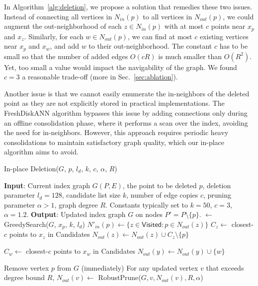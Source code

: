 In Algorithm~\ref{alg:deletion}, we propose a solution that remedies these two issues.
%
Instead of connecting all vertices in $N_{in}(p)$ to all vertices in $N_{out}(p)$, we could augment the out-neighborhood of each $z\in N_{in}(p)$ with at most $c$ points near $x_p$ and $x_z$.
%
Similarly, for each $w\in N_{out}(p)$, we can find at most $c$ existing vertices near $x_p$ and $x_w$,
and add $w$ to their out-neighborhood.
%
The constant $c$ has to be small so that the number of added edges $O(cR)$ is much smaller than $O(R^2)$.
Yet, too small a value would impact the navigability of the graph.
We found $c=3$ a reasonable trade-off (more in Sec.~\ref{sec:ablation}).

Another issue is that we cannot easily enumerate the in-neighbors of the deleted point
as they are not explicitly stored in practical implementations.
The FreshDiskANN algorithm bypasses this issue by adding connections only
during an offline consolidation phase, where it performs a scan over the index,
avoiding the need for in-neighbors. However, this approach requires
periodic heavy consolidations to maintain satisfactory graph quality,
which our in-place algorithm aims to avoid.

\begin{algorithm}[b]
\caption{In-place Deletion($G$, $p$, $l_{d}$, $k$, $c$, $\alpha$, $R$)}
\label{alg:deletion}
\begin{algorithmic}[1]
\State \textbf{Input}: Current index graph $G(P,E)$, the point to be deleted $p$,
deletion parameter $l_d=128$, candidate list size $k$, number of edge copies $c$, pruning parameter $\alpha > 1$, graph degree $R$.
Constants typically set to $k=50$,  $c=3$, $\alpha=1.2$.
\State \textbf{Output}: Updated index graph $G$ on nodes $P'=P\setminus \{p\}$.
 $\gets$ GreedySearch($G$, $x_p$, $k$, $l_{d}$)
\State $N'_{in}(p)\gets \{z \in \textsf{Visited}: p \in N_{out}(z) \} $
    \State $C_z \gets$ closest-$c$ points to $x_z$ in \textsf{Candidates}
    \State $N_{out}(z) \gets N_{out}(z) \cup C_z \setminus \{p\}$
\EndFor

    \State $C_w \gets$ closest-$c$ points to $x_w$ in \textsf{Candidates}
        \State $N_{out}(y) \gets N_{out}(y) \cup \{w\} $
    \EndFor
\EndFor

\State Remove vertex $p$ from $G$ (immediately)
\State For any updated vertex $v$ that exceeds degree bound $R$, $N_{out}(v)\gets$ \textsf{RobustPrune}($G, v, N_{out}(v), R, \alpha$)
\end{algorithmic}
\end{algorithm}

